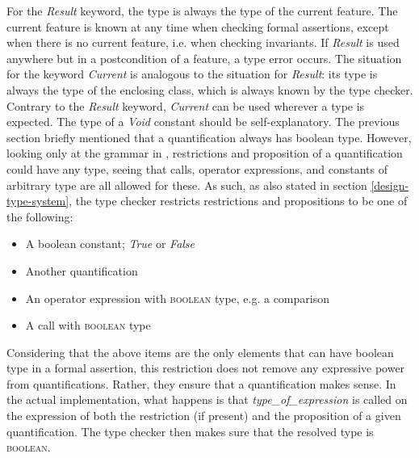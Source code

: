 For the \textit{Result} keyword, the type is always the type of the current feature. The current feature is known at any time when checking formal assertions, except when there is no current feature, i.e. when checking invariants. If \textit{Result} is used anywhere but in a postcondition of a feature, a type error occurs. The situation for the keyword \textit{Current} is analogous to the situation for \textit{Result}: its type is always the type of the enclosing class, which is always known by the type checker. Contrary to the \textit{Result} keyword, \textit{Current} can be used wherever a type is expected. The type of a \textit{Void} constant should be self-explanatory. 
\label{implementation-def-boolean-type}
The previous section briefly mentioned that a quantification always has boolean type. However, looking only at the grammar in \cite{walden1995}, restrictions and proposition of a quantification could have any type, seeing that calls, operator expressions, and constants of arbitrary type are all allowed for these. As such, as also stated in section \ref{design-type-system}, the type checker restricts restrictions and propositions to be one of the following:
\begin{itemize}
\item A boolean constant; \textit{True} or \textit{False}
\item Another quantification
\item An operator expression with \textsc{boolean} type, e.g. a comparison
\item A call with \textsc{boolean} type
\end{itemize}
Considering that the above items are the only elements that can have boolean type in a formal assertion, this restriction does not remove any expressive power from quantifications. Rather, they ensure that a quantification makes sense. In the actual implementation, what happens is that \textit{type\_of\_expression} is called on the expression of both the restriction (if present) and the proposition of a given quantification. The type checker then makes sure that the resolved type is \textsc{boolean}.